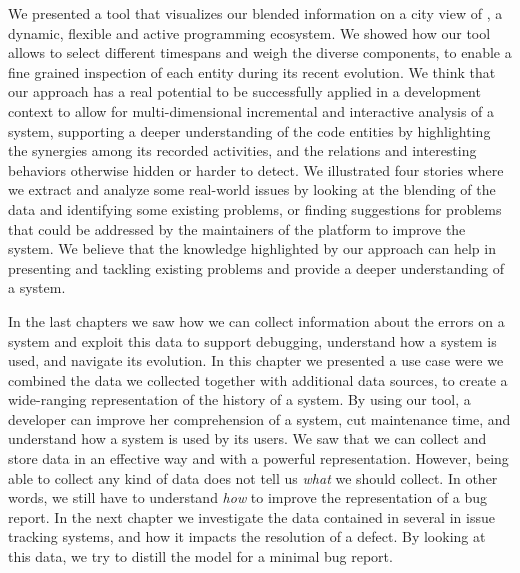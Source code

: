 We presented a tool that visualizes our blended information on a city view of \pha, a dynamic, flexible and active programming ecosystem.
We showed how our tool allows to select different timespans and weigh the diverse components, to enable a fine grained inspection of each entity during its recent evolution.
We think that our approach has a real potential to be successfully applied in a development context to allow for multi-dimensional incremental and interactive analysis of a system, supporting a deeper understanding of the code entities by highlighting the synergies among its recorded activities, and the relations and interesting behaviors otherwise hidden or harder to detect.
We illustrated four stories where we extract and analyze some real-world issues by looking at the blending of the data and identifying some existing problems, or finding suggestions for problems that could be addressed by the maintainers of the platform to improve the system.
We believe that the knowledge highlighted by our approach can help in presenting and tackling existing problems and provide a deeper understanding of a system.

In the last chapters we saw how we can collect information about the errors on a system and exploit this data to support debugging, understand how a system is used, and navigate its evolution.
In this chapter we presented a use case were we combined the data we collected together with additional data sources, to create a wide-ranging representation of the history of a system.
By using our tool, a developer can improve her comprehension of a system, cut maintenance time, and understand how a system is used by its users.
We saw that we can collect and store data in an effective way and with a powerful representation.
However, being able to collect any kind of data does not tell us \emph{what} we should collect.
In other words, we still have to understand \emph{how} to improve the representation of a bug report.
In the next chapter we investigate the data contained in several in issue tracking systems, and how it impacts the resolution of a defect.
By looking at this data, we try to distill the model for a minimal bug report.
